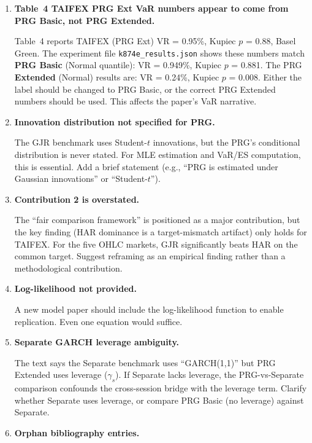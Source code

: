 \documentclass[12pt,a4paper]{article}
\begin{document}
\begin{enumerate}[label=\textbf{M\arabic*}]

\item \textbf{Table~4 TAIFEX PRG Ext VaR numbers appear to come from PRG Basic, not PRG Extended.}

Table~4 reports TAIFEX (PRG Ext) VR = 0.95\%, Kupiec $p$ = 0.88, Basel Green. The experiment file \texttt{k874e\_results.json} shows these numbers match \textbf{PRG Basic} (Normal quantile): VR = 0.949\%, Kupiec $p$ = 0.881. The PRG \textbf{Extended} (Normal) results are: VR = 0.24\%, Kupiec $p$ = 0.008. Either the label should be changed to PRG Basic, or the correct PRG Extended numbers should be used. This affects the paper's VaR narrative.

\item \textbf{Innovation distribution not specified for PRG.}

The GJR benchmark uses Student-$t$ innovations, but the PRG's conditional distribution is never stated. For MLE estimation and VaR/ES computation, this is essential. Add a brief statement (e.g., ``PRG is estimated under Gaussian innovations'' or ``Student-$t$'').

\item \textbf{Contribution 2 is overstated.}

The ``fair comparison framework'' is positioned as a major contribution, but the key finding (HAR dominance is a target-mismatch artifact) only holds for TAIFEX. For the five OHLC markets, GJR significantly beats HAR on the common target. Suggest reframing as an empirical finding rather than a methodological contribution.

\item \textbf{Log-likelihood not provided.}

A new model paper should include the log-likelihood function to enable replication. Even one equation would suffice.

\item \textbf{Separate GARCH leverage ambiguity.}

The text says the Separate benchmark uses ``GARCH(1,1)'' but PRG Extended uses leverage ($\gamma_s$). If Separate lacks leverage, the PRG-vs-Separate comparison confounds the cross-session bridge with the leverage term. Clarify whether Separate uses leverage, or compare PRG Basic (no leverage) against Separate.

\item \textbf{Orphan bibliography entries.}


\end{enumerate}
\end{document}
